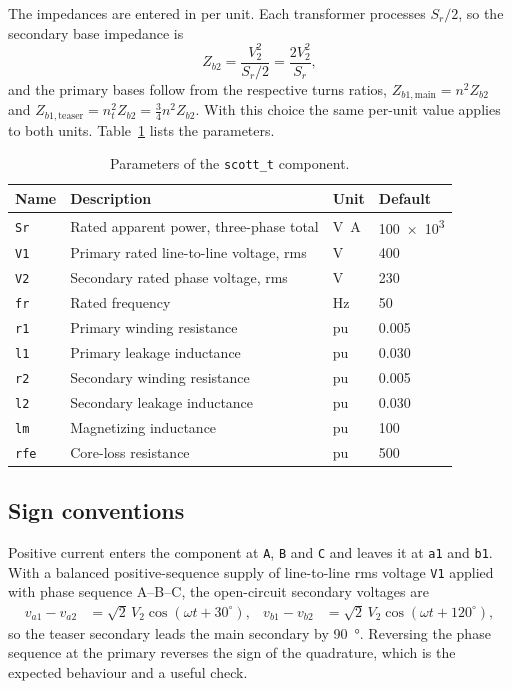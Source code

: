 \documentclass[11pt,a4paper]{article}
\begin{document}
The impedances are entered in per unit. Each transformer processes $S_r/2$, so
the secondary base impedance is
\begin{equation}
Z_{b2} = \frac{V_2^2}{S_r/2} = \frac{2V_2^2}{S_r} ,
\end{equation}
and the primary bases follow from the respective turns ratios,
$Z_{b1,\text{main}} = n^2 Z_{b2}$ and
$Z_{b1,\text{teaser}} = n_t^2 Z_{b2} = \tfrac{3}{4}n^2 Z_{b2}$. With this
choice the same per-unit value applies to both units. Table~\ref{tab:par}
lists the parameters.

\begin{table}[htbp]
\centering
\caption{Parameters of the \texttt{scott\_t} component.}
\label{tab:par}
\begin{tabular}{llll}
\toprule
Name & Description & Unit & Default \\
\midrule
\texttt{Sr}  & Rated apparent power, three-phase total & \si{\volt\ampere} & \num{100e3} \\
\texttt{V1}  & Primary rated line-to-line voltage, rms & \si{\volt} & 400 \\
\texttt{V2}  & Secondary rated phase voltage, rms      & \si{\volt} & 230 \\
\texttt{fr}  & Rated frequency                         & \si{\hertz} & 50 \\
\texttt{r1}  & Primary winding resistance              & pu & 0.005 \\
\texttt{l1}  & Primary leakage inductance              & pu & 0.030 \\
\texttt{r2}  & Secondary winding resistance            & pu & 0.005 \\
\texttt{l2}  & Secondary leakage inductance            & pu & 0.030 \\
\texttt{lm}  & Magnetizing inductance                  & pu & 100 \\
\texttt{rfe} & Core-loss resistance                    & pu & 500 \\
\bottomrule
\end{tabular}
\end{table}

\subsection{Sign conventions}

Positive current enters the component at \texttt{A}, \texttt{B} and \texttt{C}
and leaves it at \texttt{a1} and \texttt{b1}. With a balanced positive-sequence
supply of line-to-line rms voltage \texttt{V1} applied with phase sequence
A--B--C, the open-circuit secondary voltages are
\begin{align}
v_{a1}-v_{a2} &= \sqrt{2}\,V_2\cos(\omega t + 30^\circ), &
v_{b1}-v_{b2} &= \sqrt{2}\,V_2\cos(\omega t + 120^\circ),
\end{align}
so the teaser secondary leads the main secondary by \SI{90}{\degree}. Reversing
the phase sequence at the primary reverses the sign of the quadrature, which is
the expected behaviour and a useful check.
\end{document}
